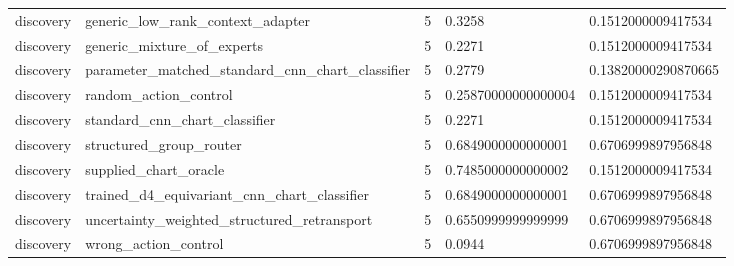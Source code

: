 \begin{table}[t]
\begin{tabular}{lllll}
discovery & generic\_low\_rank\_context\_adapter & 5 & 0.3258 & 0.1512000009417534 \\
discovery & generic\_mixture\_of\_experts & 5 & 0.2271 & 0.1512000009417534 \\
discovery & parameter\_matched\_standard\_cnn\_chart\_classifier & 5 & 0.2779 & 0.13820000290870665 \\
discovery & random\_action\_control & 5 & 0.25870000000000004 & 0.1512000009417534 \\
discovery & standard\_cnn\_chart\_classifier & 5 & 0.2271 & 0.1512000009417534 \\
discovery & structured\_group\_router & 5 & 0.6849000000000001 & 0.6706999897956848 \\
discovery & supplied\_chart\_oracle & 5 & 0.7485000000000002 & 0.1512000009417534 \\
discovery & trained\_d4\_equivariant\_cnn\_chart\_classifier & 5 & 0.6849000000000001 & 0.6706999897956848 \\
discovery & uncertainty\_weighted\_structured\_retransport & 5 & 0.6550999999999999 & 0.6706999897956848 \\
discovery & wrong\_action\_control & 5 & 0.0944 & 0.6706999897956848 \\
\bottomrule
\end{tabular}
\end{table}
